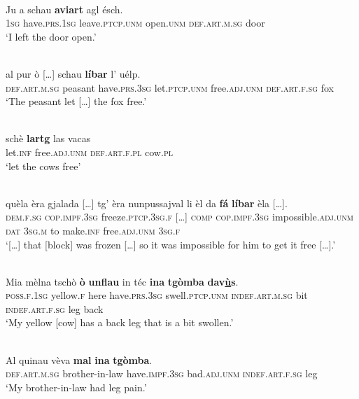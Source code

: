 \ea\label{ex:noagr:2}
\\
\gll Ju a schau \textbf{aviart} agl ésch.   \\
 \textsc{1sg} have.\textsc{prs.1sg} leave.\textsc{ptcp.unm} open.\textsc{unm} \textsc{def.art.m.sg} door\\
\glt `I left the door open.'
\z

\ea\label{ex:noagr:3}
\\
\gll    [...] al pur ò […] schau \textbf{líbar} l’ uélp.\\
     {} \textsc{def.art.m.sg} peasant have.\textsc{prs.3sg} {} let.\textsc{ptcp.unm} free.\textsc{adj.unm} \textsc{def.art.f.sg} fox\\
\glt `The peasant let […] the fox free.'
\z

\ea
\label{}
\\
\gll schè \textbf{lartg} las vacas\\
let.\textsc{inf} free.\textsc{adj.unm} \textsc{def.art.f.pl} cow.\textsc{pl}\\
\glt `let the cows free'
\z

\ea
\label{ex:noagr:4}
\\
\gll   […] quèla èra gjalada […] tg' èra nunpussajval li èl da \textbf{fá} \textbf{líbar} èla […].\\
      {} \textsc{dem.f.sg} \textsc{cop.impf.3sg} freeze.\textsc{ptcp.3sg.f} […] \textsc{comp} \textsc{cop.impf.3sg} impossible.\textsc{adj.unm} \textsc{dat} \textsc{3sg.m} to make.\textsc{inf} free.\textsc{adj.unm} \textsc{3sg.f}\\
\glt `[…] that [block] was frozen […] so it was impossible for him to get it free […].'
\z

\ea\label{ex:noagr:5}
\\
\gll  Mia mèlna tschò \textbf{ò} \textbf{unflau} in téc \textbf{ina} \textbf{tgòmba} \textbf{dav\underline{ù}s}.  \\
     \textsc{poss.f.1sg} yellow.\textsc{f} here have.\textsc{prs.3sg} swell.\textsc{ptcp.unm}  \textsc{indef.art.m.sg} bit \textsc{indef.art.f.sg} leg back\\
\glt `My yellow [cow] has a back leg that is a bit swollen.'
\z

\ea
\label{ex:noagr:6}
\\
\gll   Al quinau vèva \textbf{mal} \textbf{ina} \textbf{tgòmba}. \\
\textsc{def.art.m.sg} brother-in-law have.\textsc{impf.3sg} bad.\textsc{adj.unm} \textsc{indef.art.f.sg} leg \\
\glt `My brother-in-law had leg pain.'
\z


